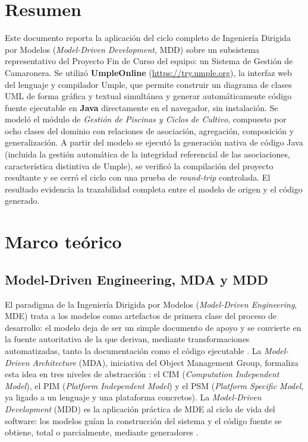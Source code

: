 \documentclass[11pt,a4paper]{article}
\begin{document}
\tableofcontents
\newpage


\section*{Resumen}
Este documento reporta la aplicaci\'on del ciclo completo de Ingenier\'ia Dirigida por Modelos (\emph{Model-Driven Development}, MDD) sobre un subsistema representativo del Proyecto Fin de Curso del equipo: un Sistema de Gesti\'on de Camaronera. Se utiliz\'o \textbf{UmpleOnline} (\url{https://try.umple.org}), la interfaz web del lenguaje y compilador Umple, que permite construir un diagrama de clases UML de forma gr\'afica y textual simult\'anea y generar autom\'aticamente c\'odigo fuente ejecutable en \textbf{Java} directamente en el navegador, sin instalaci\'on. Se model\'o el m\'odulo de \emph{Gesti\'on de Piscinas y Ciclos de Cultivo}, compuesto por ocho clases del dominio con relaciones de asociaci\'on, agregaci\'on, composici\'on y generalizaci\'on. A partir del modelo se ejecut\'o la generaci\'on nativa de c\'odigo Java (incluida la gesti\'on autom\'atica de la integridad referencial de las asociaciones, caracter\'istica distintiva de Umple), se verific\'o la compilaci\'on del proyecto resultante y se cerr\'o el ciclo con una prueba de \emph{round-trip} controlada. El resultado evidencia la trazabilidad completa entre el modelo de origen y el c\'odigo generado.

\section{Marco te\'orico}

\subsection{Model-Driven Engineering, MDA y MDD}
El paradigma de la Ingenier\'ia Dirigida por Modelos (\emph{Model-Driven Engineering}, MDE) trata a los modelos como artefactos de primera clase del proceso de desarrollo: el modelo deja de ser un simple documento de apoyo y se convierte en la fuente autoritativa de la que derivan, mediante transformaciones automatizadas, tanto la documentaci\'on como el c\'odigo ejecutable \cite{brambilla2022}. La \emph{Model-Driven Architecture} (MDA), iniciativa del Object Management Group, formaliza esta idea en tres niveles de abstracci\'on \cite{omg2014mda}: el CIM (\emph{Computation Independent Model}), el PIM (\emph{Platform Independent Model}) y el PSM (\emph{Platform Specific Model}, ya ligado a un lenguaje y una plataforma concretos). La \emph{Model-Driven Development} (MDD) es la aplicaci\'on pr\'actica de MDE al ciclo de vida del software: los modelos gu\'ian la construcci\'on del sistema y el c\'odigo fuente se obtiene, total o parcialmente, mediante generadores \cite{brambilla2022}.
\end{document}
